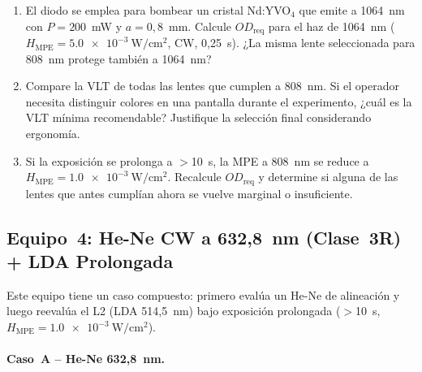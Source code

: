 \documentclass[12pt,a4paper]{article}
\begin{document}
\begin{enumerate}
	\item[\textbf{P3.1}] El diodo se emplea para bombear un cristal Nd:YVO$_4$
	      que emite a 1064~nm con $P = 200$~mW y $a = 0{,}8$~mm. Calcule
	      $OD_{\mathrm{req}}$ para el haz de 1064~nm
	      ($H_{\mathrm{MPE}} = \SI{5.0e-3}{\watt\per\centi\metre\squared}$,
	      CW, 0,25~s). ¿La misma lente seleccionada para 808~nm protege
	      también a 1064~nm?

	\item[\textbf{P3.2}] Compare la VLT de todas las lentes que cumplen a
	      808~nm. Si el operador necesita distinguir colores en una pantalla
	      durante el experimento, ¿cuál es la VLT mínima recomendable?
	      Justifique la selección final considerando ergonomía.

	\item[\textbf{P3.3}] Si la exposición se prolonga a $>$10~s, la MPE a
	      808~nm se reduce a
	      $H_{\mathrm{MPE}} = \SI{1.0e-3}{\watt\per\centi\metre\squared}$.
	      Recalcule $OD_{\mathrm{req}}$ y determine si alguna de las lentes
	      que antes cumplían ahora se vuelve marginal o insuficiente.
\end{enumerate}

\subsection{Equipo~4: He-Ne CW a 632,8~nm (Clase~3R) + LDA Prolongada}
\label{sec:eq4}

Este equipo tiene un caso compuesto: primero evalúa un He-Ne de alineación y
luego reevalúa el L2 (LDA 514,5~nm) bajo exposición prolongada ($>$10~s,
$H_{\mathrm{MPE}} = \SI{1.0e-3}{\watt\per\centi\metre\squared}$).

\paragraph{Caso~A -- He-Ne 632,8~nm.}
\end{document}
